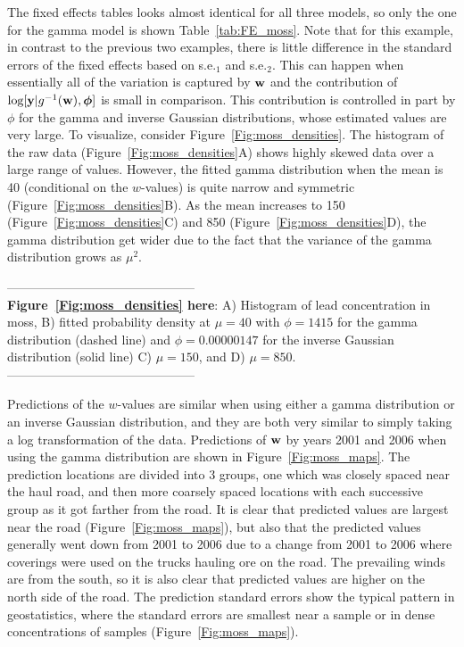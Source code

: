\documentclass[12pt, titlepage]{article}
\begin{document}
The fixed effects tables looks almost identical for all three models, so only the one for the gamma model is shown Table~\ref{tab:FE_moss}.  Note that for this example, in contrast to the previous two examples, there is little difference in the standard errors of the fixed effects based on s.e.$_{1}$ and s.e.$_{2}$.  This can happen when essentially all of the variation is captured by $\mathbf{w}$ and the contribution of $\textrm{log}[\mathbf{y}|g^{-1}(\mathbf{w}),\boldsymbol{\phi}]$ is small in comparison.  This contribution is controlled in part by $\phi$ for the gamma and inverse Gaussian distributions, whose estimated values are very large.  To visualize, consider Figure~\ref{Fig:moss_densities}.  The histogram of the raw data (Figure~\ref{Fig:moss_densities}A) shows highly skewed data over a large range of values.  However, the fitted gamma distribution when the mean is 40 (conditional on the $w$-values) is quite narrow and symmetric (Figure~\ref{Fig:moss_densities}B). As the mean increases to 150 (Figure~\ref{Fig:moss_densities}C) and 850 (Figure~\ref{Fig:moss_densities}D), the gamma distribution get wider due to the fact that the variance of the gamma distribution grows as $\mu^{2}$.

\begin{spacing}{0.8}
\vspace{.4cm}
\noindent --------------------------------------------- \\
\textbf{Figure~\ref{Fig:moss_densities} here}: A) Histogram of lead concentration in moss, B) fitted probability density at $\mu = 40$ with $\phi = 1415$ for the gamma distribution (dashed line) and  $\phi = 0.00000147$ for the inverse Gaussian distribution (solid line) C) $\mu = 150$, and D) $\mu = 850$. \\
--------------------------------------------- \\ 
\end{spacing}

Predictions of the $w$-values are similar when using either a gamma distribution or an inverse Gaussian distribution, and they are both very similar to simply taking a log transformation of the data.  Predictions of $\mathbf{w}$ by years 2001 and 2006 when using the gamma distribution are shown in Figure~\ref{Fig:moss_maps}. The prediction locations are divided into 3 groups, one which was closely spaced near the haul road, and then more coarsely spaced locations with each successive group as it got farther from the road.   It is clear that predicted values are largest near the road (Figure~\ref{Fig:moss_maps}), but also that the predicted values generally went down from 2001 to 2006 due to a change from 2001 to 2006 where coverings were used on the trucks hauling ore on the road.  The prevailing winds are from the south, so it is also clear that predicted values are higher on the north side of the road.  The prediction standard errors show the typical pattern in geostatistics, where the standard errors are smallest near a sample or in dense concentrations of samples (Figure~\ref{Fig:moss_maps}).
\end{document}
